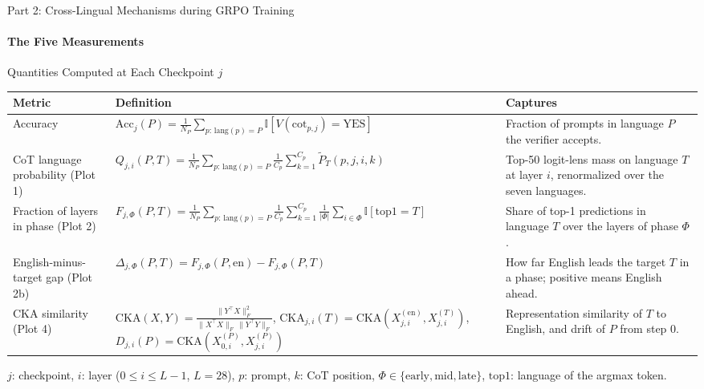 \documentclass[aspectratio=169]{beamer}
\begin{document}
	\begin{frame}{Part 2: Cross-Lingual Mechanisms during GRPO Training}
		\framesubtitle{The Five Measurements}
		\begin{block}{\scriptsize Quantities Computed at Each Checkpoint $j$}\tiny
			\renewcommand{\arraystretch}{2.2}
			\setlength{\tabcolsep}{4pt}
			\begin{tabular}{@{}p{} >{\centering\arraybackslash}p{} p{}@{}}
				\toprule
				Metric & Definition & Captures \\
				\midrule
				Accuracy &
				$\displaystyle \mathrm{Acc}_j(P) = \frac{1}{N_P} \sum_{p:\,\mathrm{lang}(p)=P} \mathbb{I}\!\left[ V(\mathrm{cot}_{p,j}) = \text{YES} \right]$ &
				Fraction of prompts in language $P$ the verifier accepts. \\
				
				CoT language probability (Plot 1) &
				$\displaystyle Q_{j,i}(P,T) = \frac{1}{N_P}\!\! \sum_{p:\,\mathrm{lang}(p)=P} \frac{1}{C_p} \sum_{k=1}^{C_p} \tilde{P}_T(p,j,i,k)$ &
				Top-50 logit-lens mass on language $T$ at layer $i$, renormalized over the seven languages. \\
				
				Fraction of layers in phase (Plot 2) &
				$\displaystyle F_{j,\Phi}(P,T) = \frac{1}{N_P}\!\! \sum_{p:\,\mathrm{lang}(p)=P} \frac{1}{C_p} \sum_{k=1}^{C_p} \frac{1}{|\Phi|} \sum_{i \in \Phi} \mathbb{I}\!\left[ \mathrm{top1} = T \right]$ &
				Share of top-1 predictions in language $T$ over the layers of phase $\Phi$. \\
				
				English-minus-target gap (Plot 2b) &
				$\displaystyle \Delta_{j,\Phi}(P,T) = F_{j,\Phi}(P,\text{en}) - F_{j,\Phi}(P,T)$ &
				How far English leads the target $T$ in a phase; positive means English ahead. \\
				
				CKA similarity (Plot 4) &
				$\displaystyle \mathrm{CKA}(X,Y) = \frac{\lVert Y^\top X \rVert_F^2}{\lVert X^\top X \rVert_F\, \lVert Y^\top Y \rVert_F}$, $\displaystyle \mathrm{CKA}_{j,i}(T) = \mathrm{CKA}\!\left( X^{(\text{en})}_{j,i}, X^{(T)}_{j,i} \right)$, $\displaystyle D_{j,i}(P) = \mathrm{CKA}\!\left( X^{(P)}_{0,i}, X^{(P)}_{j,i} \right)$ &
				Representation similarity of $T$ to English, and drift of $P$ from step 0. \\
				\bottomrule
			\end{tabular}
				\vspace{0.5em}
			{\tiny $j$: checkpoint, \; $i$: layer ($0 \le i \le L{-}1$, $L{=}28$), \; $p$: prompt, \; $k$: CoT position, \; $\Phi \in \{\text{early},\text{mid},\text{late}\}$, \; $\mathrm{top1}$: language of the argmax token.}
		\end{block}
	
		
	\end{frame}
	
\end{document}
